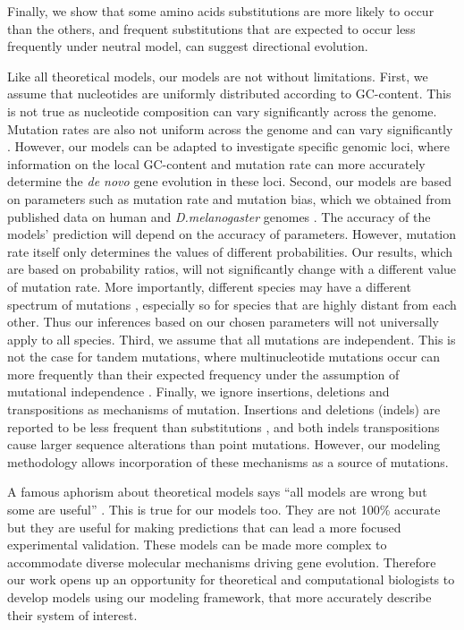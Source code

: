 \documentclass[12pt,a4paper]{article}
\begin{document}
Finally, we show that some amino acids substitutions are more likely to occur than the others, and frequent  substitutions that are expected to occur less frequently under neutral model, can suggest directional evolution. 

Like all theoretical models, our models are not without limitations. First, we assume that nucleotides are uniformly distributed according to GC-content. This is not true as nucleotide composition can vary significantly across the genome. Mutation rates are also not uniform across the genome and can vary significantly \citep{mutbiasArabidopsis}. However, our models can be adapted to investigate specific genomic loci, where information on the local GC-content and mutation rate can more accurately determine the \textit{de novo} gene evolution in these loci. Second, our models are based on parameters such as mutation rate and mutation bias, which we obtained from published data on human and \textit{D.melanogaster} genomes \citep{humanmutrate,drosophilamutrate}. The accuracy of the models' prediction will depend on the accuracy of parameters. However, mutation rate itself only determines the values of different probabilities. Our results, which are based on probability ratios, will not significantly change with a different value of mutation rate. More importantly, different species may have a different spectrum of mutations \citep{joshmutbias}, especially so for species that are highly distant from each other. Thus our inferences based on our chosen parameters will not universally apply to all species. Third, we assume that all mutations are independent. This is not the case for tandem mutations, where multinucleotide mutations occur can more frequently than their expected frequency under the assumption of mutational independence \citep{MNM}. Finally, we ignore insertions, deletions and transpositions as mechanisms of mutation. Insertions and deletions (indels) are reported to be less frequent than substitutions \citep{drosophilamutrate}, and both indels transpositions cause larger sequence alterations than point mutations. However, our modeling methodology allows incorporation of these mechanisms as a source of mutations. 

A famous aphorism about theoretical models says ``all models are wrong but some are useful'' \citep{GEBox}. This is true for our models too. They are not 100\% accurate but they are useful for making predictions that can lead a more focused experimental validation. These models can be made more complex to accommodate diverse molecular mechanisms driving gene evolution. Therefore our work opens up an opportunity for theoretical and computational biologists to develop models using our modeling framework, that more accurately describe their system of interest.
\end{document}
